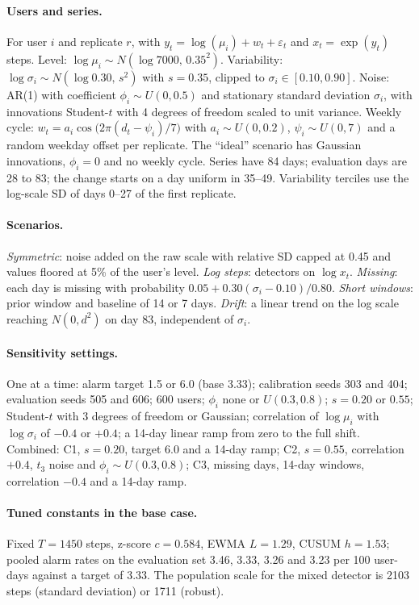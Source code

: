 \documentclass[11pt,a4paper]{article}
\begin{document}
\paragraph{Users and series.}
For user $i$ and replicate $r$, with $y_t=\log(\mu_i)+w_t+\varepsilon_t$ and $x_t=\exp(y_t)$ steps. Level: $\log\mu_i\sim N(\log 7000,\,0.35^2)$. Variability: $\log\sigma_i\sim N(\log 0.30,\,s^2)$ with $s=0.35$, clipped to $\sigma_i\in[0.10,0.90]$. Noise: AR(1) with coefficient $\phi_i\sim U(0,0.5)$ and stationary standard deviation $\sigma_i$, with innovations Student-$t$ with 4 degrees of freedom scaled to unit variance. Weekly cycle: $w_t=a_i\cos\bigl(2\pi(d_t-\psi_i)/7\bigr)$ with $a_i\sim U(0,0.2)$, $\psi_i\sim U(0,7)$ and a random weekday offset per replicate. The ``ideal'' scenario has Gaussian innovations, $\phi_i=0$ and no weekly cycle. Series have 84 days; evaluation days are 28 to 83; the change starts on a day uniform in 35--49. Variability terciles use the log-scale SD of days 0--27 of the first replicate.
\paragraph{Scenarios.}
\emph{Symmetric}: noise added on the raw scale with relative SD capped at 0.45 and values floored at 5\% of the user's level. \emph{Log steps}: detectors on $\log x_t$. \emph{Missing}: each day is missing with probability $0.05+0.30(\sigma_i-0.10)/0.80$. \emph{Short windows}: prior window and baseline of 14 or 7 days. \emph{Drift}: a linear trend on the log scale reaching $N(0,d^2)$ on day 83, independent of $\sigma_i$.
\paragraph{Sensitivity settings.}
One at a time: alarm target 1.5 or 6.0 (base 3.33); calibration seeds 303 and 404; evaluation seeds 505 and 606; 600 users; $\phi_i$ none or $U(0.3,0.8)$; $s=0.20$ or $0.55$; Student-$t$ with 3 degrees of freedom or Gaussian; correlation of $\log\mu_i$ with $\log\sigma_i$ of $-0.4$ or $+0.4$; a 14-day linear ramp from zero to the full shift. Combined: C1, $s=0.20$, target 6.0 and a 14-day ramp; C2, $s=0.55$, correlation $+0.4$, $t_3$ noise and $\phi_i\sim U(0.3,0.8)$; C3, missing days, 14-day windows, correlation $-0.4$ and a 14-day ramp.
\paragraph{Tuned constants in the base case.}
Fixed $T=1450$ steps, z-score $c=0.584$, EWMA $L=1.29$, CUSUM $h=1.53$; pooled alarm rates on the evaluation set 3.46, 3.33, 3.26 and 3.23 per 100 user-days against a target of 3.33. The population scale for the mixed detector is 2103 steps (standard deviation) or 1711 (robust).
\end{document}
